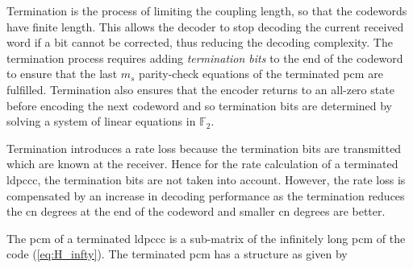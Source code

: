 Termination is the process of limiting the coupling length, so that the codewords have finite length. This allows the decoder to stop decoding the current received word if a bit cannot be corrected, thus reducing the decoding complexity. The termination process requires adding \emph{termination bits} to the end of the codeword to ensure that the last $m_s$ parity-check equations of the terminated \gls{pcm} are fulfilled. Termination also ensures that the encoder returns to an all-zero state before encoding the next codeword and so termination bits are determined by solving a system of linear equations in $\mathbb{F}_2$. 

Termination introduces a rate loss because the termination bits are transmitted which are known at the receiver. Hence for the rate calculation of a terminated \gls{ldpccc}, the termination bits are not taken into account. However, the rate loss is compensated by an increase in decoding performance as the termination reduces the \gls{cn} degrees at the end of the codeword and smaller \gls{cn} degrees are better.

The \gls{pcm} of a terminated \gls{ldpccc} is a sub-matrix of the infinitely long \gls{pcm} of the code (\ref{eq:H_infty}). The terminated \gls{pcm} has a structure as given by

